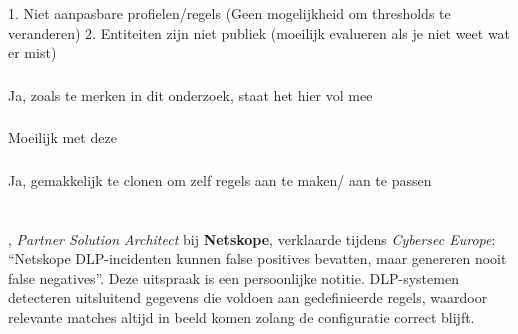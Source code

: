 1. Niet aanpasbare profielen/regels (Geen mogelijkheid om thresholds te veranderen)
2. Entiteiten zijn niet publiek (moeilijk evalueren als je niet weet wat er mist)

\subsubsection{}
\label{}

Ja, zoals te merken in dit onderzoek, staat het hier vol mee

\subsubsection{}
\label{}

Moeilijk met deze

\subsubsection{}
\label{}

Ja, gemakkelijk te clonen om zelf regels aan te maken/ aan te passen

\section{}
\label{sec:res-eigen-gedefinieerde-dlp-regels}


\subsection{}
\label{sec:functionaliteit-resultaten-eigen}

\subsection{}
\label{sec:correctheid-resultaten-eigen}

\textcite{Quaeyhaegens2025}, \textit{Partner Solution Architect} bij \textbf{Netskope}, verklaarde tijdens \textit{Cybersec Europe}: 
``Netskope DLP-incidenten kunnen false positives bevatten, maar genereren nooit false negatives''. 
Deze uitspraak is een persoonlijke notitie. 
DLP-systemen detecteren uitsluitend gegevens die voldoen aan gedefinieerde regels, waardoor relevante matches altijd in beeld komen zolang de configuratie correct blijft.

